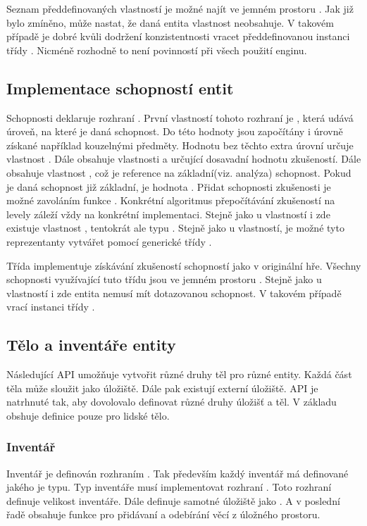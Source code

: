  Seznam předdefinovaných vlastností je možné najít ve jemném prostoru .
 Jak již bylo zmíněno, může nastat, že daná entita vlastnost neobsahuje. V takovém případě je dobré kvůli dodržení konzistentnosti
vracet předdefinovanou instanci  třídy . Nicméně rozhodně to není povinností při všech použití enginu.

\subsection{Implementace schopností entit}
Schopnosti deklaruje rozhraní . První vlastností tohoto rozhraní je , která udává úroveň,
na které je daná schopnost. Do této hodnoty jsou započítány i úrovně získané například kouzelnými předměty. Hodnotu
bez těchto extra úrovní určuje vlastnost . Dále obsahuje vlastnosti  a 
určující dosavadní hodnotu zkušeností. Dále obsahuje vlastnost , což je reference na základní(viz. analýza) schopnost. Pokud
je daná schopnost již základní, je hodnota . Přidat schopnosti zkušenosti je možné zavoláním funkce .
Konkrétní algoritmus přepočítávání zkušeností na levely záleží vždy  na konkrétní implementaci. Stejně jako u vlastností 
i zde existuje vlastnost , tentokrát ale typu . Stejně jako u vlastností, je možné tyto reprezentanty
vytvářet pomocí generické třídy . 

Třída  implementuje získávání zkušeností schopností jako v originální hře. Všechny schopnosti 
využívající tuto třídu jsou ve jemném prostoru . Stejně jako
u vlastností i zde entita nemusí mít dotazovanou schopnost. V takovém případě vrací instanci třídy .

\subsection{Tělo a inventáře entity}
Následující API umožňuje vytvořit různé druhy těl pro různé entity. Každá část těla může sloužit jako úložiště. Dále pak existují externí
úložiště. API je natrhnuté tak, aby dovolovalo definovat různé druhy úložišť a těl. V základu obshuje definice pouze pro lidské tělo.

\subsubsection{Inventář}
Inventář je definován rozhraním . Tak především každý inventář má definované jakého je typu. Typ inventáře musí implementovat
rozhraní . Toto rozhraní definuje velikost inventáře. Dále definuje samotné úložiště jako . A 
v poslední řadě obsahuje funkce pro přidávaní a odebírání věcí  z úložného prostoru.

